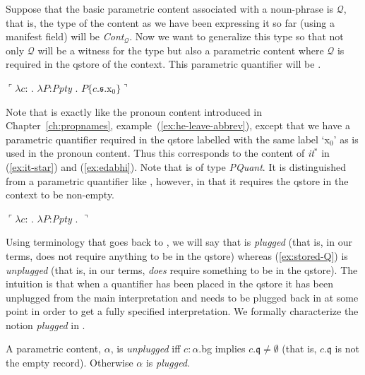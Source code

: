 Suppose that the basic parametric content associated with a
noun-phrase is $\mathcal{Q}$, that is, the type of the content as we
have been expressing it so far (using a manifest field) will be
\textit{Cont}$_{\mathcal{Q}}$.  Now we want to generalize this type so
that not only $\mathcal{Q}$ will be a witness for the type but also a
parametric content where $\mathcal{Q}$ is required in the qstore of
the context.  This parametric quantifier will be \nexteg{}.
\begin{ex} 
  $\ulcorner\lambda c$: . $\lambda
  P$:\textit{Ppty} . $P\{c.\mathfrak{s}.\text{x}_0\}\urcorner$
\label{ex:stored-Q}        
\end{ex} 
Note that \preveg{} is exactly like the pronoun content introduced in
Chapter~\ref{ch:propnames}, example~(\ref{ex:he-leave-abbrev}), except that we have a parametric quantifier required in the
qstore labelled with the same label `x$_0$' as is used in the pronoun
content.  Thus this corresponds to the content of \textit{it}$^*$ in
(\ref{ex:it-star}) and (\ref{ex:edabhi}).  Note that \preveg{} is of
type \textit{PQuant}.  It is distinguished from a parametric
quantifier like \nexteg{}, however, in that it requires the qstore in
the context to be non-empty.
\begin{ex} 
$\ulcorner\lambda c$: . $\lambda
      P$:\textit{Ppty} . $\urcorner$ 
\end{ex} 
Using terminology that goes back to
\cite{Bos1996}, we will say that \preveg{} is \textit{plugged} (that
is, in our terms, does not require anything to be in the qstore)
whereas (\ref{ex:stored-Q}) is \textit{unplugged} (that is, in our
terms, \textit{does} require something to be in the qstore).  The
intuition is that when a quantifier has been placed in the qstore it
has been unplugged from the main interpretation and needs to be
plugged back in at some point in order to get a fully specified
interpretation.  We formally characterize the notion \textit{plugged}
in \nexteg{}.
\begin{ex} 
A parametric content, $\alpha$, is \textit{unplugged} iff $c:\alpha$.bg implies $c.\mathfrak{q}\not=\emptyset$
(that is, $c.\mathfrak{q}$ is not the empty record).  Otherwise $\alpha$
is \textit{plugged}. 
\end{ex} 
  

